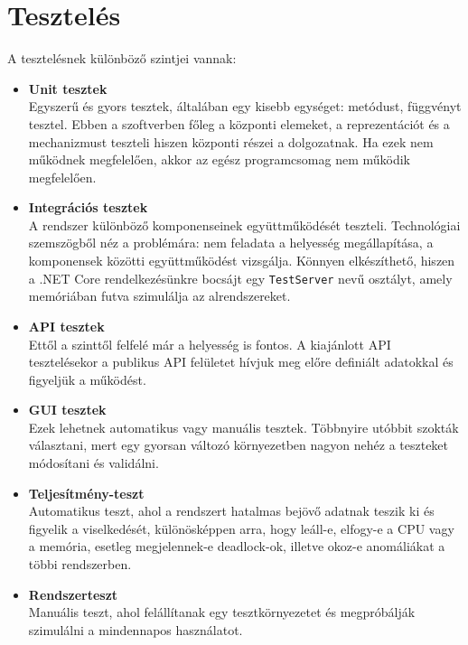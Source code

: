 \documentclass[twoside, a4paper, 12pt]{book}
\begin{document}
\chapter{Tesztelés}
A tesztelésnek különböző szintjei vannak:
\begin{itemize}
	\item \textbf{Unit tesztek} \\
	Egyszerű és gyors tesztek, általában egy kisebb egységet: metódust, függvényt tesztel. Ebben a szoftverben főleg a központi elemeket, a reprezentációt és a mechanizmust teszteli hiszen központi részei a dolgozatnak. Ha ezek nem működnek megfelelően, akkor az egész programcsomag nem működik megfelelően.
	
	\item \textbf{Integrációs tesztek} \\
	A rendszer különböző komponenseinek együttműködését teszteli. Technológiai szemszögből néz a problémára: nem feladata a helyesség megállapítása, a komponensek közötti együttműködést vizsgálja. Könnyen elkészíthető, hiszen a .NET Core rendelkezésünkre bocsájt egy \texttt{TestServer} nevű osztályt, amely memóriában futva szimulálja az alrendszereket.
	
	\item \textbf{API tesztek} \\
	Ettől a szinttől felfelé már a helyesség is fontos. A kiajánlott API tesztelésekor a publikus API felületet hívjuk meg előre definiált adatokkal és figyeljük a működést.
	
	\item \textbf{GUI tesztek} \\
	Ezek lehetnek automatikus vagy manuális tesztek. Többnyire utóbbit szokták választani, mert egy gyorsan változó környezetben nagyon nehéz a teszteket módosítani és validálni.
	
	\item \textbf{Teljesítmény-teszt} \\
	Automatikus teszt, ahol a rendszert hatalmas bejövő adatnak teszik ki és figyelik a viselkedését, különösképpen arra, hogy leáll-e, elfogy-e a CPU vagy a memória, esetleg megjelennek-e deadlock-ok, illetve okoz-e anomáliákat a többi rendszerben.
	
	\item \textbf{Rendszerteszt} \\
	Manuális teszt, ahol felállítanak egy tesztkörnyezetet és megpróbálják szimulálni a mindennapos használatot.
	
\end{itemize}
\end{document}

